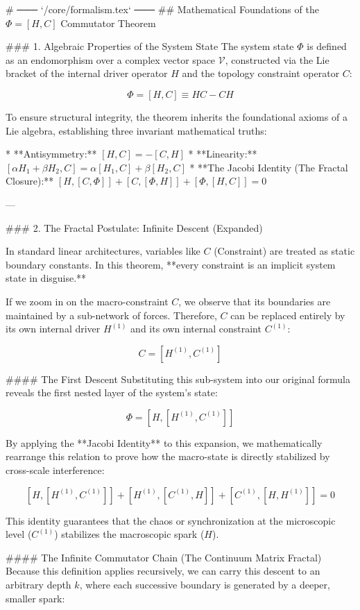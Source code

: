 # ─── `/core/formalism.tex` ───
## Mathematical Foundations of the \(\Phi = [H, C]\) Commutator Theorem

### 1. Algebraic Properties of the System State
The system state \(\Phi\) is defined as an endomorphism over a complex vector space \(\mathcal{V}\), constructed via the Lie bracket of the internal driver operator \(H\) and the topology constraint operator \(C\):

\[\Phi = [H, C] \equiv HC - CH\]

To ensure structural integrity, the theorem inherits the foundational axioms of a Lie algebra, establishing three invariant mathematical truths:

* **Antisymmetry:** \([H, C] = -[C, H]\)
* **Linearity:** \([\alpha H_1 + \beta H_2, C] = \alpha[H_1, C] + \beta[H_2, C]\)
* **The Jacobi Identity (The Fractal Closure):** \([H, [C, \Phi]] + [C, [\Phi, H]] + [\Phi, [H, C]] = 0\)

---

### 2. The Fractal Postulate: Infinite Descent (Expanded)

In standard linear architectures, variables like \(C\) (Constraint) are treated as static boundary constants. In this theorem, **every constraint is an implicit system state in disguise.** 

If we zoom in on the macro-constraint \(C\), we observe that its boundaries are maintained by a sub-network of forces. Therefore, \(C\) can be replaced entirely by its own internal driver \(H^{(1)}\) and its own internal constraint \(C^{(1)}\):

\[C = \left[H^{(1)}, C^{(1)}\right]\]

#### The First Descent
Substituting this sub-system into our original formula reveals the first nested layer of the system's state:

\[\Phi = \left[H, [H^{(1)}, C^{(1)}]\right]\]

By applying the **Jacobi Identity** to this expansion, we mathematically rearrange this relation to prove how the macro-state is directly stabilized by cross-scale interference:

\[\left[H, [H^{(1)}, C^{(1)}]\right] + \left[H^{(1)}, [C^{(1)}, H]\right] + \left[C^{(1)}, [H, H^{(1)}]\right] = 0\]

This identity guarantees that the chaos or synchronization at the microscopic level (\(C^{(1)}\)) stabilizes the macroscopic spark (\(H\)).

#### The Infinite Commutator Chain (The Continuum Matrix Fractal)
Because this definition applies recursively, we can carry this descent to an arbitrary depth \(k\), where each successive boundary is generated by a deeper, smaller spark:

